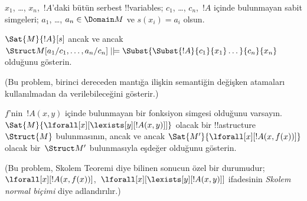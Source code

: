 \documentclass[../../../include/open-logic-section]{subfiles}
\begin{document}
\begin{prob}
\begin{enumerate}

\end{enumerate}
$x_1$, \dots, $x_n$,~$!A$'daki bütün serbest !!{variable}s;
$c_1$, \dots, $c_n$,~$!A$ içinde bulunmayan sabit simgeleri;
$a_1$, \dots, $a_n \in \Domain M$ ve $s(x_i) = a_i$ olsun.

$\Sat{M}{!A}[s]$ ancak ve ancak
$\Struct M[a_1/c_1,\dots,a_n/c_n]
\VDash \Subst{\Subst{!A}{c_1}{x_1}\dots}{c_n}{x_n}$ olduğunu gösterin.

(Bu problem, birinci dereceden mantığa ilişkin semantiğin değişken
atamaları kullanılmadan da verilebileceğini gösterir.)
\end{prob}

\begin{prob}
$f$'nin~$!A(x,y)$ içinde bulunmayan bir fonksiyon simgesi olduğunu
varsayın. $\Sat{M}{\lforall[x][\lexists[y][!A(x,y)]]}$ olacak bir
!!a{structure}~$\Struct{M}$ bulunmasının, ancak ve ancak
$\Sat{M'}{\lforall[x][!A(x,f(x))]}$ olacak bir~$\Struct M'$ bulunmasıyla
eşdeğer olduğunu gösterin.

(Bu problem, Skolem Teoremi diye bilinen sonucun özel bir durumudur;
$\lforall[x][!A(x,f(x))]$,~$\lforall[x][\lexists[y][!A(x,y)]]$ ifadesinin
\emph{Skolem normal biçimi} diye adlandırılır.)
\end{prob}
\end{document}
